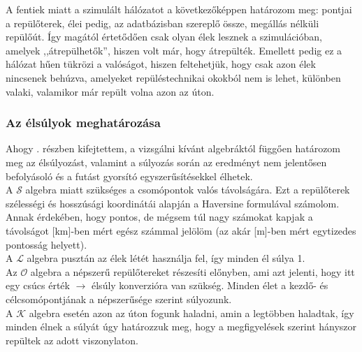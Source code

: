    A fentiek miatt a szimulált hálózatot a következőképpen határozom meg: pontjai a repülőterek, élei pedig, az adatbázisban szereplő össze, megállás nélküli repülőút. Így magától értetődően csak olyan élek lesznek a szimulációban, amelyek ,,átrepülhetők'', hiszen volt már, hogy átrepülték. Emellett pedig ez a hálózat hűen tükrözi a valóságot, hiszen feltehetjük, hogy csak azon élek nincsenek behúzva, amelyeket repüléstechnikai okokból nem is lehet, különben valaki, valamikor már repült volna azon az úton.

      \subsubsection{Az élsúlyok meghatározása}
      Ahogy . részben kifejtettem, a vizsgálni kívánt algebráktól függően határozom meg az élsúlyozást, valamint a súlyozás során az eredményt nem jelentősen befolyásoló és a futást gyorsító egyszerűsítésekkel élhetek.\\

      A $\mathcal{S}$ algebra miatt szükséges a csomópontok valós távolságára. Ezt a repülőterek szélességi és hosszúsági koordinátái alapján a Haversine formulával számolom. Annak érdekében, hogy pontos, de mégsem túl nagy számokat kapjak a távolságot [km]-ben mért egész számmal jelölöm (az akár [m]-ben mért egytizedes pontosság helyett).\\
      A $\mathcal{L}$ algebra pusztán az élek létét használja fel, így minden él súlya 1.\\
      Az $\mathcal{O}$ algebra a népszerű repülőtereket részesíti előnyben, ami azt jelenti, hogy itt egy csúcs érték $\rightarrow$ élsúly konverzióra van szükség. Minden élet a kezdő- és célcsomópontjának a népszerűsége szerint súlyozunk.\\
      A $\mathcal{K}$ algebra esetén azon az úton fogunk haladni, amin a legtöbben haladtak, így minden élnek a súlyát úgy határozzuk meg, hogy a megfigyelések szerint hányszor repültek az adott viszonylaton.

